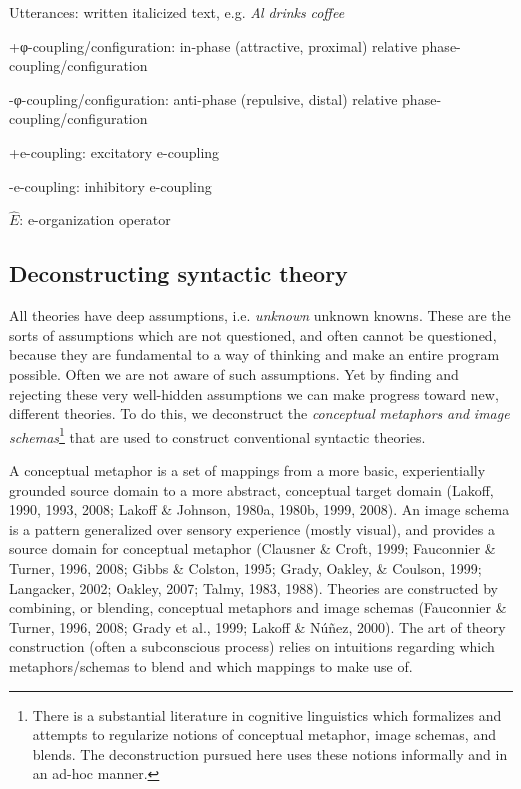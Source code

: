 Utterances: written italicized text, e.g. \textit{Al} \textit{drinks} \textit{coffee}

+φ-coupling/configuration: in-phase (attractive, proximal) relative phase-coupling/configuration

{}-φ-coupling/configuration: anti-phase (repulsive, distal) relative phase-coupling/configuration

+e-coupling: excitatory e-coupling

{}-e-coupling: inhibitory e-coupling

 $\widehat {{E}}$: e-organization operator

\subsection{Deconstructing syntactic theory}

All theories have deep assumptions, i.e. \textit{unknown} unknown knowns. These are the sorts of assumptions which are not questioned, and often cannot be questioned, because they are fundamental to a way of thinking and make an entire program possible. Often we are not aware of such assumptions. Yet by finding and rejecting these very well-hidden assumptions we can make progress toward new, different theories. To do this, we deconstruct the \textit{conceptual} \textit{metaphors} \textit{and} \textit{image} \textit{schemas}\footnote{There is a substantial literature in cognitive linguistics which formalizes and attempts to regularize notions of conceptual metaphor, image schemas, and blends. The deconstruction pursued here uses these notions informally and in an ad-hoc manner.} that are used to construct conventional syntactic theories. 

  A conceptual metaphor is a set of mappings from a more basic, experientially grounded source domain to a more abstract, conceptual target domain (Lakoff, 1990, 1993, 2008; Lakoff \& Johnson, 1980a, 1980b, 1999, 2008). An image schema is a pattern generalized over sensory experience (mostly visual), and provides a source domain for conceptual metaphor (Clausner \& Croft, 1999; Fauconnier \& Turner, 1996, 2008; Gibbs \& Colston, 1995; Grady, Oakley, \& Coulson, 1999; Langacker, 2002; Oakley, 2007; Talmy, 1983, 1988). Theories are constructed by combining, or blending, conceptual metaphors and image schemas (Fauconnier \& Turner, 1996, 2008; Grady et al., 1999; Lakoff \& Núñez, 2000). The art of theory construction (often a subconscious process) relies on intuitions regarding which metaphors/schemas to blend and which mappings to make use of.

